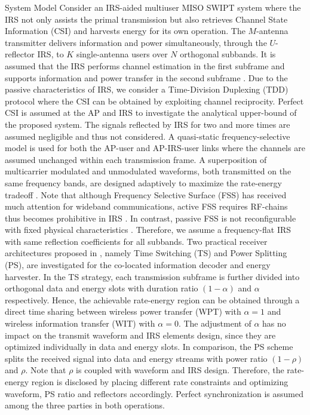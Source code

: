 \documentclass{IEEEtran}
\begin{document}
\begin{section} {System Model}
	Consider an IRS-aided multiuser MISO SWIPT system where the IRS not only assists the primal transmission but also retrieves Channel State Information (CSI) and harvests energy for its own operation. The $M$-antenna transmitter delivers information and power simultaneously, through the $U$-reflector IRS, to $K$ single-antenna users over $N$ orthogonal subbands. It is assumed that the IRS performs channel estimation in the first subframe and supports information and power transfer in the second subframe \cite{Zheng2019}. Due to the passive characteristics of IRS, we consider a Time-Division Duplexing (TDD) protocol where the CSI can be obtained by exploiting channel reciprocity. Perfect CSI is assumed at the AP and IRS to investigate the analytical upper-bound of the proposed system. The signals reflected by IRS for two and more times are assumed negligible and thus not considered. A quasi-static frequency-selective model is used for both the AP-user and AP-IRS-user links where the channels are assumed unchanged within each transmission frame. A superposition of multicarrier modulated and unmodulated waveforms, both transmitted on the same frequency bands, are designed adaptively to maximize the rate-energy tradeoff \cite{Clerckx2018b}. Note that although Frequency Selective Surface (FSS) has received much attention for wideband communications, active FSS requires RF-chains thus becomes prohibitive in IRS \cite{Kim2006,Xu2014}. In contrast, passive FSS is not reconfigurable with fixed physical characteristics \cite{Anwar2018}. Therefore, we assume a frequency-flat IRS with same reflection coefficients for all subbands. Two practical receiver architectures proposed in \cite{Zhang2013}, namely Time Switching (TS) and Power Splitting (PS), are investigated for the co-located information decoder and energy harvester. In the TS strategy, each transmission subframe is further divided into orthogonal data and energy slots with duration ratio $(1 - \alpha)$ and $\alpha$ respectively. Hence, the achievable rate-energy region can be obtained through a direct time sharing between wireless power transfer (WPT) with $\alpha=1$ and wireless information transfer (WIT) with $\alpha=0$. The adjustment of $\alpha$ has no impact on the transmit waveform and IRS elements design, since they are optimized individually in data and energy slots. In comparison, the PS scheme splits the received signal into data and energy streams with power ratio $(1 - \rho)$ and $\rho$. Note that $\rho$ is coupled with waveform and IRS design. Therefore, the rate-energy region is disclosed by placing different rate constraints and optimizing waveform, PS ratio and reflectors accordingly. Perfect synchronization is assumed among the three parties in both operations.


\end{section}
\end{document}
